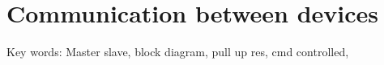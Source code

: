 \chapter{Communication between devices}
Key words: Master slave, block diagram, pull up res, cmd controlled,  